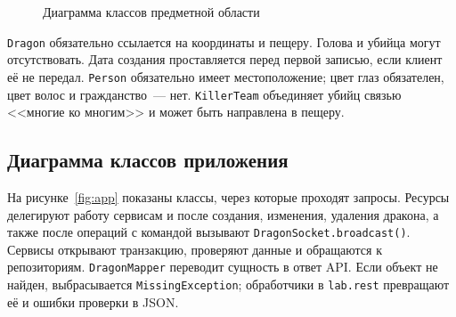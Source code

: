 \documentclass[12pt,a4paper]{article}
\begin{document}
\begin{figure}[H]
{%
}
\caption{Диаграмма классов предметной области}
\label{fig:domain}
\end{figure}

\texttt{Dragon} обязательно ссылается на координаты и пещеру. Голова и убийца могут отсутствовать. Дата создания проставляется перед первой записью, если клиент её не передал. \texttt{Person} обязательно имеет местоположение; цвет глаз обязателен, цвет волос и гражданство~--- нет. \texttt{KillerTeam} объединяет убийц связью <<многие ко многим>> и может быть направлена в пещеру.

\subsection{Диаграмма классов приложения}

На рисунке~\ref{fig:app} показаны классы, через которые проходят запросы. Ресурсы делегируют работу сервисам и после создания, изменения, удаления дракона, а также после операций с командой вызывают \texttt{DragonSocket.broadcast()}. Сервисы открывают транзакцию, проверяют данные и обращаются к репозиториям. \texttt{DragonMapper} переводит сущность в ответ API. Если объект не найден, выбрасывается \texttt{MissingException}; обработчики в \texttt{lab.rest} превращают её и ошибки проверки в JSON.
\end{document}
